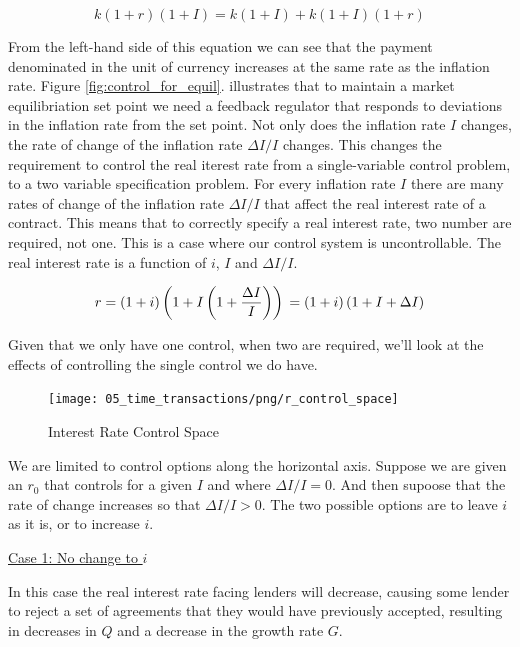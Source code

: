 \[
     k(1+r)(1+I) = k(1+I) + k(1+I)(1+r)
 \]

From the left-hand side of this equation we can see that the payment denominated in the unit of
currency increases at the same rate as the inflation rate. Figure \ref{fig:control_for_equil}.
illustrates that to maintain a market equilibriation set point we need a feedback regulator that
responds to deviations in the inflation rate from the set point.  Not only does the inflation rate
$I$ changes, the rate of change of the  inflation rate $ \Delta I / I $ changes. This
changes the requirement to control the real iterest rate from a single-variable control problem, to
a two variable specification problem. For every inflation rate $I$ there are many rates of change of
the inflation rate $\Delta I/I$ that affect the real interest rate of a contract. This means that to
correctly specify a real interest rate, two number are required, not one. This is a case where our
control system is uncontrollable. The real interest rate is a function of $i$, $I$ and $\Delta I/I$.

\begin{equation}
    \label{equation:real_interest_rate}
    r = (1+i) \left( 1 + I \left( 1+ \frac {\Delta I} I \right) \right) \\
      = (1+i) \left( 1 + I + \Delta I \right)
\end{equation}

Given that we only have one control, when two are required, we'll look at the effects of controlling
the single control we do have.

\begin{figure}[H]
\centering
\texttt{[image: 05\_time\_transactions/png/r\_control\_space]}
\caption{Interest Rate Control Space}
\label{fig:r_control_space}
\end{figure}

We are limited to control options along the horizontal axis. Suppose we are given an $r_0$ that
controls for a given $I$ and where $\Delta I/I = 0$. And then supoose that the rate of change
increases so that $\Delta I/I > 0$. The two possible options are to leave $i$ as it is, or to
increase $i$.

\underline{Case 1: No change to $i$}

In this case the real interest rate facing lenders will decrease, causing some lender to reject
a set of agreements that they would have previously accepted, resulting in decreases in
$Q$ and a decrease in the growth rate $G$.

